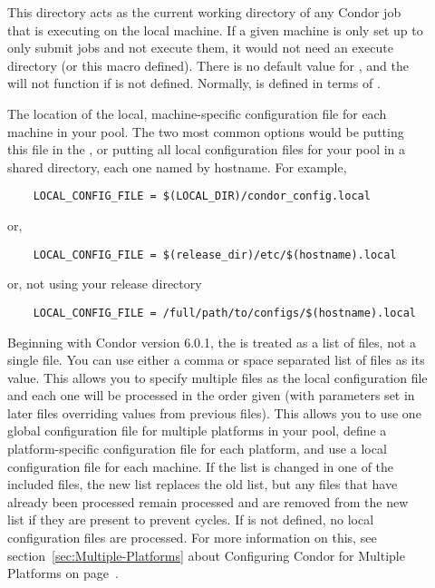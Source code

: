 \begin{description}
\item[] \label{param:Execute} This directory acts as
  the current working directory of any Condor job that is executing on
  the local machine.  If a given machine is only set up to only submit
  jobs and not execute them, it would not need an execute directory
  (or this macro defined).  There is no default value for
  , and the  will not function if
   is not defined.  Normally,  is
  defined in terms of .
  
\item[] \label{param:LocalConfigFile} The
  location of the local, machine-specific configuration
  file for each machine
  in your pool.  The two most common options would be putting this
  file in the , or putting all
  local configuration files for your pool in a shared directory, each one
  named by hostname.  For example,
  \begin{verbatim}
    LOCAL_CONFIG_FILE = $(LOCAL_DIR)/condor_config.local
  \end{verbatim}
  or,
  \begin{verbatim}
    LOCAL_CONFIG_FILE = $(release_dir)/etc/$(hostname).local
  \end{verbatim}
  or, not using your release directory
  \begin{verbatim}
    LOCAL_CONFIG_FILE = /full/path/to/configs/$(hostname).local
  \end{verbatim}
  
  Beginning with Condor version 6.0.1, the
   is treated as a list of files, not a
  single file.  You can use either a comma or space separated list of
  files as its value.  This allows you to specify multiple files as
  the local configuration file and each one will be processed in the
  order given (with parameters set in later files overriding values
  from previous files).  This allows you to use one global
  configuration file for multiple platforms in your pool, define a
  platform-specific configuration file for each platform, and use a
  local configuration file for each machine. 
  If the list is changed in one of the included files, the new list
  replaces the old list, but any files that have already been processed
  remain processed and are removed from the new list if they are present
  to prevent cycles.
  If  is not defined, no local configuration
  files are processed.  For more information on this, see
  section~\ref{sec:Multiple-Platforms} about Configuring Condor for
  Multiple Platforms on page~\pageref{sec:Multiple-Platforms}.


\end{description}
